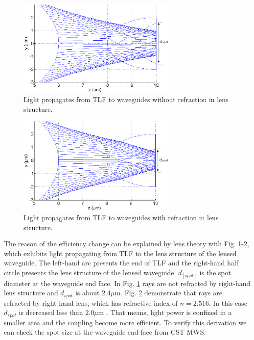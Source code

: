 \begin{figure}[!ht]
\centering
\includegraphics[width=0.7\textwidth]{bilder/beam_ray_without_refract}
\caption{Light propagates from TLF to waveguides without refraction in lens structure.}
\label{fig:matlab_coupling_lenses_rxx}
\end{figure}
\begin{figure}[!ht]
\centering
\includegraphics[width=0.7\textwidth]{bilder/beam_ray_refract}
\caption{ Light propagates from TLF to waveguides with refraction in lens structure.}
\label{fig:matlab_coupling_lenses_rxx2}
\end{figure} 
The reason of the efficiency change can be explained by lens theory with Fig. \ref{fig:matlab_coupling_lenses_rxx}-\ref{fig:matlab_coupling_lenses_rxx2}, which exhibits light propagating from TLF to the lens structure of the lensed waveguide. The left-hand arc presents the end of TLF and the right-hand half circle presents the lens structure of the lensed waveguide. $d_[spot]$ is the spot diameter at the waveguide end face. In Fig. \ref{fig:matlab_coupling_lenses_rxx} rays are not refracted by right-hand lens structure and $d_{spot}$ is about $2.4\mu$m. Fig. \ref{fig:matlab_coupling_lenses_rxx2} demonstrate that rays are refracted by right-hand lens, which has refractive index of $n=2.516$. In this case $d_{spot}$ is decreased less than $2.0\mu$m . That means, light power is confined in a smaller area and the coupling become more efficient. To verify this derivation we can check the spot size at the waveguide end face from CST MWS.\\

